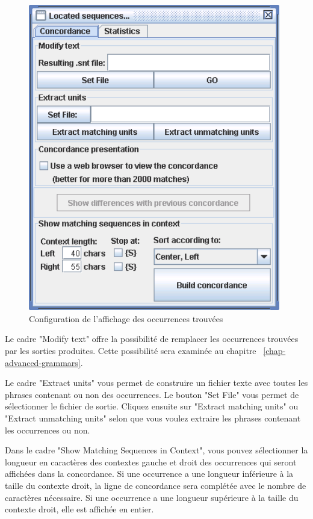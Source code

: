 \bigskip
\begin{figure}[!ht]
\begin{center}
\includegraphics[width=11cm]{resources/img/fig4-6.png}
\caption{Configuration de l’affichage des occurrences trouvées\label{fig-configuration-concordance}}
\end{center}
\end{figure}

\bigskip
\noindent Le cadre "Modify text" offre la possibilité de remplacer les occurrences trouvées par les
sorties produites. Cette possibilité sera examinée au chapitre
~\ref{chap-advanced-grammars}.

\bigskip
\noindent Le cadre "Extract units" vous permet de construire un fichier texte avec toutes les phrases
contenant ou non des occurrences. Le bouton "Set File" vous permet de sélectionner le fichier
de sortie. Cliquez ensuite sur "Extract matching units" ou "Extract unmatching units" selon
que vous voulez extraire les phrases contenant les occurrences ou non.


\bigskip
\noindent Dans le cadre "Show Matching Sequences in Context", vous pouvez sélectionner la
longueur en caractères des contextes gauche et droit des occurrences qui seront affichées dans
la concordance. Si une occurrence a une longueur inférieure à la taille du contexte droit, la
ligne de concordance sera complétée avec le nombre de caractères nécessaire. Si une occurrence 
a une longueur supérieure à la taille du contexte droit, elle est affichée en entier.



